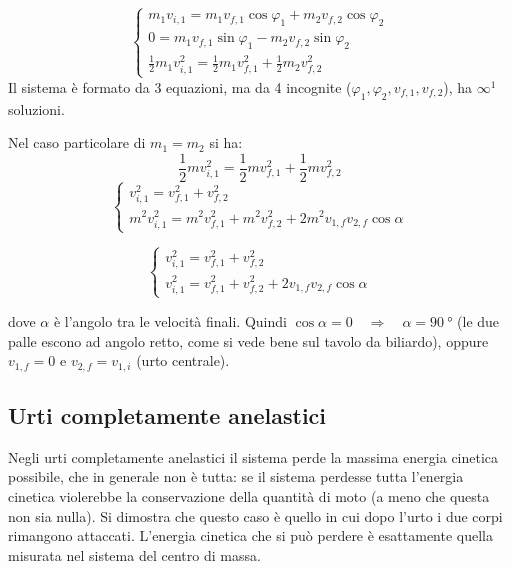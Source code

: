 \[\left\{
  \begin{array}{l}
    m_1v_{i,1}=m_1v_{f,1}\cos\varphi_1+m_2v_{f,2}\cos\varphi_2 \\
    0=m_1v_{f,1}\sin\varphi_1-m_2v_{f,2}\sin\varphi_2          \\
    \frac{1}{2}m_1 v_{i,1}^2=\frac{1}{2}m_1 v_{f,1}^2+\frac{1}{2}m_2
    v_{f,2}^2
  \end{array}\right.\]
Il sistema è formato da 3 equazioni, ma da 4 incognite
($\varphi_1, \varphi_2, v_{f,1}, v_{f,2}$), ha $\infty^1$
soluzioni.

Nel caso particolare di $m_1=m_2$ si ha:
\[\frac{1}{2}m v_{i,1}^2=\frac{1}{2}m
  v_{f,1}^2+\frac{1}{2}m v_{f,2}^2\]
\[\left\{
  \begin{array}{l}
    v_{i,1}^2=v_{f,1}^2+v_{f,2}^2 \\
    m^2v_{i,1}^2=m^2v_{f,1}^2+m^2v_{f,2}^2+2m^2v_{1,f}v_{2,f}\cos\alpha
  \end{array}
  \right.\]

\[\left\{
  \begin{array}{l}
    v_{i,1}^2=v_{f,1}^2+v_{f,2}^2 \\
    v_{i,1}^2=v_{f,1}^2+v_{f,2}^2+2v_{1,f}v_{2,f}\cos\alpha
  \end{array}
  \right.\]

dove $\alpha$ è l'angolo tra le velocità finali. Quindi $\cos \alpha=0\quad\Rightarrow\quad\alpha=\SI{90}{\degree}$ (le due palle escono ad angolo retto, come si vede bene sul tavolo da biliardo), oppure $v_{1,f}=0$ e $v_{2,f}=v_{1,i}$ (urto centrale).

\subsection{Urti completamente anelastici}

Negli urti completamente anelastici il sistema perde la massima energia cinetica possibile, che in generale non è tutta:
se il sistema perdesse tutta l'energia cinetica violerebbe la conservazione
della quantità di moto (a meno che questa non sia nulla). Si dimostra che questo caso è quello in cui dopo l'urto i due corpi
rimangono attaccati. L'energia cinetica che si può perdere è esattamente quella misurata nel sistema del centro di massa.

